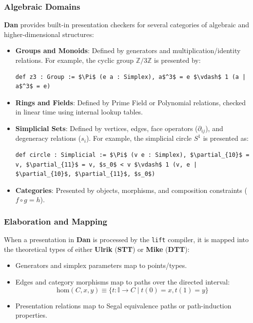 \documentclass[11pt]{article}
\newcommand{\dan}[0]{\textbf{Dan}}
\newcommand{\mike}[0]{\textbf{Mike}}
\newcommand{\ulrik}[0]{\textbf{Ulrik}}
\newcommand{\stt}[0]{\textbf{STT}}
\newcommand{\dtt}[0]{\textbf{DTT}}
\newcommand{\homtype}[3]{\text{hom}(#1, #2, #3)}
\begin{document}
\subsubsection{Algebraic Domains}
\dan{} provides built-in presentation checkers for several categories of algebraic and higher-dimensional structures:
\begin{itemize}
    \item \textbf{Groups and Monoids}: Defined by generators and multiplication/identity relations. For example, the cyclic group $\mathbb{Z}/3\mathbb{Z}$ is presented by:
    \begin{lstlisting}[language=ulrik,mathescape=true]
    def z3 : Group := $\Pi$ (e a : Simplex), a$^3$ = e $\vdash$ 1 (a | a$^3$ = e)
    \end{lstlisting}
    \item \textbf{Rings and Fields}: Defined by Prime Field or Polynomial relations, checked in linear time using internal lookup tables.
    \item \textbf{Simplicial Sets}: Defined by vertices, edges, face operators ($\partial_{ij}$), and degeneracy relations ($s_i$). For example, the simplicial circle $S^1$ is presented as:
    \begin{lstlisting}[language=ulrik,mathescape=true]
    def circle : Simplicial := $\Pi$ (v e : Simplex), $\partial_{10}$ = v, $\partial_{11}$ = v, $s_0$ < v $\vdash$ 1 (v, e | $\partial_{10}$, $\partial_{11}$, $s_0$)
    \end{lstlisting}
    \item \textbf{Categories}: Presented by objects, morphisms, and composition constraints ($f \circ g = h$).
\end{itemize}

\subsubsection{Elaboration and Mapping}
When a presentation in \dan{} is processed by the \texttt{lift} compiler, it is mapped into the theoretical types of either \ulrik{} (\stt{}) or \mike{} (\dtt{}):
\begin{itemize}
    \item Generators and simplex parameters map to points/types.
    \item Edges and category morphisms map to paths over the directed interval:
    \begin{equation}
        \homtype{C}{x}{y} \equiv \{ t : \mathbb{I} \to C \mid t(0) = x, t(1) = y \}
    \end{equation}
    \item Presentation relations map to Segal equivalence paths or path-induction properties.
\end{itemize}
\end{document}
